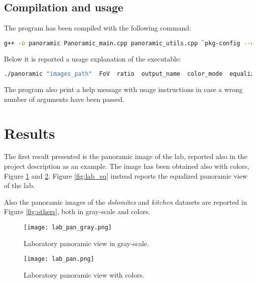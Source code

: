 \documentclass[11pt,a4paper]{article}
\begin{document}


\subsection{Compilation and usage}

The program has been compiled with the following command:
\begin{lstlisting}[language=BASH,numbers=none]
	g++ -o panoramic Panoramic_main.cpp panoramic_utils.cpp `pkg-config --cflags --libs opencv`
\end{lstlisting}

Below it is reported a usage explanation of the executable:
\begin{lstlisting}[language=BASH,numbers=none] 
	./panoramic "images_path"  FoV  ratio  output_name  color_mode  equalization
\end{lstlisting}

The program also print a help message with usage instructions in case a wrong number of arguments have been passed.

\section{Results} %

The first result presented is the panoramic image of the lab, reported also in the project description as an example. The image has been obtained also with colors, Figure \ref{fig:lab_g} and \ref{fig:lab_rgb}. Figure \ref{fig:lab_eq} instead reports the equalized panoramic view of the lab.

Also the panoramic images of the \textit{dolomites} and \textit{kitchen} datasets are reported in Figure \ref{fig:others}, both in gray-scale and colors.

\begin{figure}[h]
	\centering
	\texttt{[image: lab\_pan\_gray.png]}
	\caption{Laboratory panoramic view in gray-scale.}
	\label{fig:lab_g}
\end{figure}

\begin{figure}[h]
	\centering
	\texttt{[image: lab\_pan.png]}
	\caption{Laboratory panoramic view with colors.}
	\label{fig:lab_rgb}
\end{figure}
\end{document}
